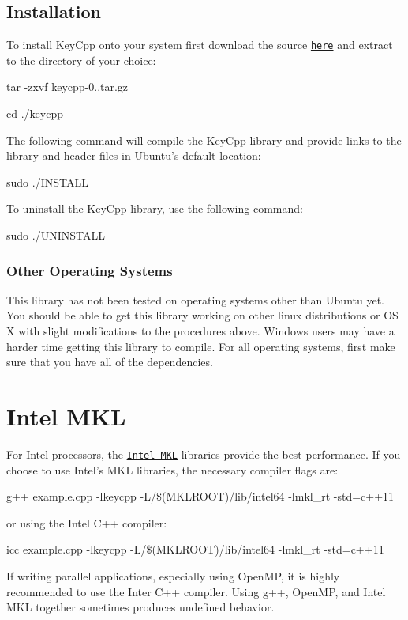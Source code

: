 \subsection*{Installation}

To install Key\-Cpp onto your system first download the source \href{releases/keycpp-0.1.tar.gz}{\tt here} and extract to the directory of your choice\-:

{\ttfamily tar -\/zxvf keycpp-\/0..\-tar.\-gz}

{\ttfamily cd ./keycpp}

The following command will compile the Key\-Cpp library and provide links to the library and header files in Ubuntu's default location\-:

{\ttfamily sudo ./\-I\-N\-S\-T\-A\-L\-L}

To uninstall the Key\-Cpp library, use the following command\-:

{\ttfamily sudo ./\-U\-N\-I\-N\-S\-T\-A\-L\-L}

\subsubsection*{Other Operating Systems}

This library has not been tested on operating systems other than Ubuntu yet. You should be able to get this library working on other linux distributions or O\-S X with slight modifications to the procedures above. Windows users may have a harder time getting this library to compile. For all operating systems, first make sure that you have all of the dependencies.

\section*{Intel M\-K\-L}

For Intel processors, the \href{http://software.intel.com/en-us/intel-mkl}{\tt Intel M\-K\-L} libraries provide the best performance. If you choose to use Intel's M\-K\-L libraries, the necessary compiler flags are\-:

{\ttfamily g++ example.\-cpp -\/lkeycpp -\/\-L/\$(M\-K\-L\-R\-O\-O\-T)/lib/intel64 -\/lmkl\-\_\-rt -\/std=c++11}

or using the Intel C++ compiler\-:

{\ttfamily icc example.\-cpp -\/lkeycpp -\/\-L/\$(M\-K\-L\-R\-O\-O\-T)/lib/intel64 -\/lmkl\-\_\-rt -\/std=c++11}

If writing parallel applications, especially using Open\-M\-P, it is highly recommended to use the Inter C++ compiler. Using {\ttfamily g++}, Open\-M\-P, and Intel M\-K\-L together sometimes produces undefined behavior.

